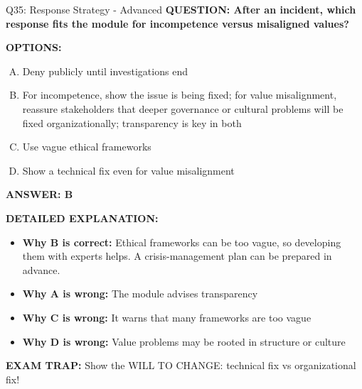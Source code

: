 \documentclass[8pt]{beamer}
\begin{document}
\begin{frame}[shrink=6]{Q35: Response Strategy - Advanced}
\fontsize{6.5}{7.5}\selectfont
\textbf{QUESTION: After an incident, which response fits the module for incompetence versus misaligned values?}

\vspace{0.1cm}
\textbf{OPTIONS:}
\begin{enumerate}[A.]
\item Deny publicly until investigations end
\item For incompetence, show the issue is being fixed; for value misalignment, reassure stakeholders that deeper governance or cultural problems will be fixed organizationally; transparency is key in both
\item Use vague ethical frameworks
\item Show a technical fix even for value misalignment
\end{enumerate}

\vspace{0.1cm}
\textcolor{myblue}{\textbf{ANSWER: B}}

\vspace{0.1cm}
\textbf{DETAILED EXPLANATION:}
\begin{itemize}
\item \textbf{Why B is correct:} Ethical frameworks can be too vague, so developing them with experts helps. A crisis-management plan can be prepared in advance.
\item \textbf{Why A is wrong:} The module advises transparency
\item \textbf{Why C is wrong:} It warns that many frameworks are too vague
\item \textbf{Why D is wrong:} Value problems may be rooted in structure or culture
\end{itemize}

\textcolor{myred}{\textbf{EXAM TRAP:}} Show the WILL TO CHANGE: technical fix vs organizational fix!
\end{frame}

\end{document}
